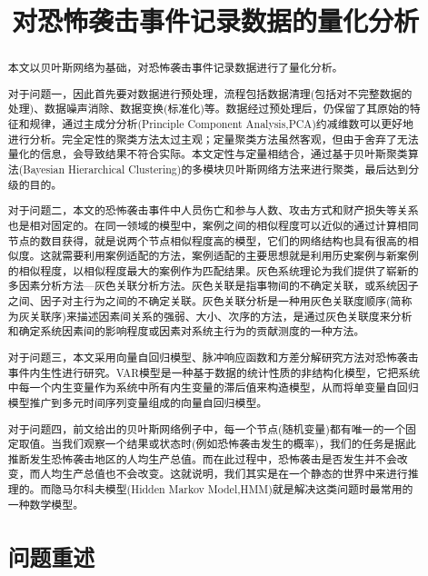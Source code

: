 \documentclass[bwprint]{gmcmthesis}
\title{对恐怖袭击事件记录数据的量化分析}
\begin{document}
 
\maketitle
 
\begin{abstract}
本文以贝叶斯网络为基础，对恐怖袭击事件记录数据进行了量化分析。

对于问题一，因此首先要对数据进行预处理，流程包括数据清理(包括对不完整数据的处理)、数据噪声消除、数据变换(标准化)等。数据经过预处理后，仍保留了其原始的特征和规律，通过主成分分析(Principle Component Analysis,PCA)约减维数可以更好地进行分析。完全定性的聚类方法太过主观；定量聚类方法虽然客观，但由于舍弃了无法量化的信息，会导致结果不符合实际。本文定性与定量相结合，通过基于贝叶斯聚类算法(Bayesian Hierarchical Clustering)的多模块贝叶斯网络方法来进行聚类，最后达到分级的目的。

对于问题二，本文的恐怖袭击事件中人员伤亡和参与人数、攻击方式和财产损失等关系也是相对固定的。在同一领域的模型中，案例之间的相似程度可以近似的通过计算相同节点的数目获得，就是说两个节点相似程度高的模型，它们的网络结构也具有很高的相似度。这就需要利用案例适配的方法，案例适配的主要思想就是利用历史案例与新案例的相似程度，以相似程度最大的案例作为匹配结果。灰色系统理论为我们提供了崭新的多因素分析方法—灰色关联分析方法。灰色关联是指事物间的不确定关联，或系统因子之间、因子对主行为之间的不确定关联。灰色关联分析是一种用灰色关联度顺序(简称为灰关联序)来描述因素间关系的强弱、大小、次序的方法，是通过灰色关联度来分析和确定系统因素间的影响程度或因素对系统主行为的贡献测度的一种方法。

对于问题三，本文采用向量自回归模型、脉冲响应函数和方差分解研究方法对恐怖袭击事件内生性进行研究。VAR模型是一种基于数据的统计性质的非结构化模型，它把系统中每一个内生变量作为系统中所有内生变量的滞后值来构造模型，从而将单变量自回归模型推广到多元时间序列变量组成的向量自回归模型。

对于问题四，前文给出的贝叶斯网络例子中，每一个节点(随机变量)都有唯一的一个固定取值。当我们观察一个结果或状态时(例如恐怖袭击发生的概率)，我们的任务是据此推断发生恐怖袭击地区的人均生产总值。而在此过程中，恐怖袭击是否发生并不会改变，而人均生产总值也不会改变。这就说明，我们其实是在一个静态的世界中来进行推理的。而隐马尔科夫模型(Hidden Markov Model,HMM)就是解决这类问题时最常用的一种数学模型。

\newpage


\pagestyle{plain}

\tableofcontents
\newpage

\section{问题重述}


\end{abstract}
\end{document}
